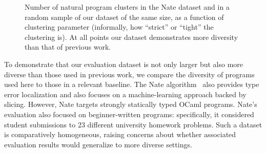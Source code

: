 \documentclass[conference]{IEEEtran}
\begin{document}

\begin{figure}
\caption{Number of natural program clusters in the Nate dataset and in a
random sample of our dataset of the same size, as a function
of clustering parameter (informally, how ``strict'' or ``tight'' the
clustering is). At all points our dataset demonstrates more diversity than
that of previous work.}
\label{fig-diversity}
\end{figure}

To demonstrate that our evaluation dataset is not only larger but also more
diverse than those used in previous work, we compare the diversity of
programs used here to those in a relevant baseline. The Nate
algorithm~\cite{learning-to-blame} also provides type error localization
and also focuses on a machine-learning approach backed by slicing. However,
Nate targets strongly statically typed OCaml programs. Nate's evaluation
also focused on beginner-written programs: specifically, it considered
student submissions to 23 different university homework problems.  Such a
dataset is comparatively homogeneous, raising concerns about whether
associated evaluation results would generalize to more diverse settings.
\end{document}

